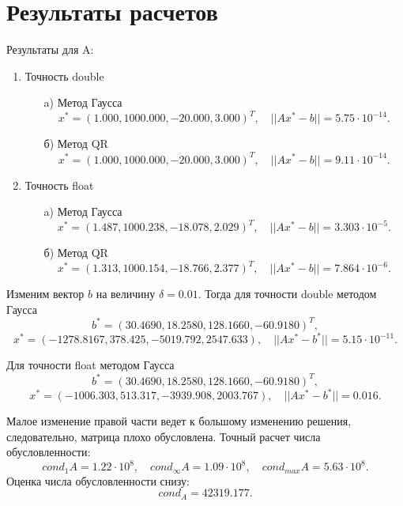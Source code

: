 \documentclass[12pt, a4paper]{article}
\begin{document}
\newpage

\section{Результаты расчетов}
Результаты для A:
\begin{enumerate}
\item Точность double
	\begin{enumerate}
	\item[a)] Метод Гаусса
	$$x^* = (1{.}000 , 1000{.}000, -20{.}000 ,3{.}000)^{T},\quad ||Ax^{*}-b|| = 5{.}75\cdot10^{-14}.$$
	\item[б)] Метод QR
	$$x^* = (1{.}000 , 1000{.}000, -20{.}000 ,3{.}000)^{T},\quad ||Ax^{*}-b|| = 9{.}11\cdot10^{-14}.$$
	\end{enumerate}
\item Точность float
	\begin{enumerate}
	\item[a)] Метод Гаусса
	$$x^* = (1{.}487 , 1000{.}238, -18{.}078 ,2{.}029)^{T},\quad ||Ax^{*}-b|| = 3{.}303\cdot10^{-5}.$$
	\item[б)] Метод QR
$$x^* = (1{.}313 , 1000{.}154, -18{.}766 ,2{.}377)^{T},\quad ||Ax^{*}-b|| = 7{.}864\cdot10^{-6}.$$
	\end{enumerate}
\end{enumerate}
Изменим вектор $b$ на величину $\delta = 0.01$. Тогда для точности double методом Гаусса
$$b^* = (30.4690, 18{.}2580, 128{.}1660, -60{.}9180)^T,$$
$$x^* = (-1278{.}8167, 378{.}425, -5019{.}792, 2547{.}633), \quad ||Ax^{*}-b^*|| =  5{.}15\cdot10^{-11}.$$

Для точности float методом Гаусса
$$b^* = (30.4690, 18{.}2580, 128{.}1660, -60{.}9180)^T,$$
$$x^* = (-1006{.}303, 513{.}317, -3939{.}908, 2003{.}767), \quad ||Ax^{*}-b^*|| =  0{.}016.$$

Малое изменение правой части ведет к большому изменению решения, следовательно, матрица плохо обусловлена. Точный расчет числа обусловленности: 
$$cond_1A = 1{.}22\cdot10^8,\quad cond_{\infty}A = 1{.}09\cdot10^8, \quad cond_{max}A = 5{.}63\cdot10^8 .$$ 
Оценка числа обусловленности снизу:
$$cond_A = 42319{.}177.$$
\end{document}
